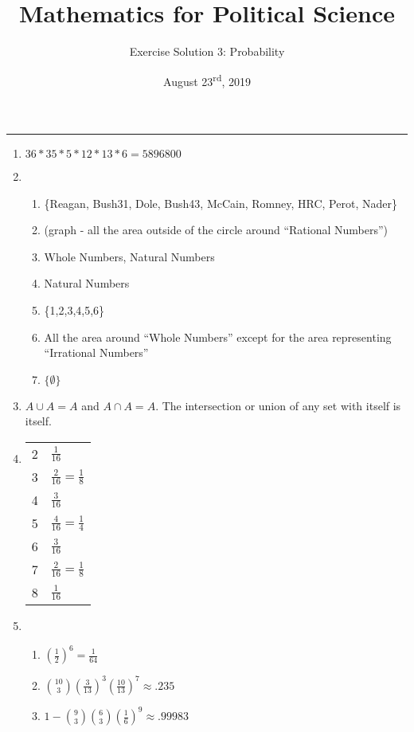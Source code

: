 \documentclass[11pt]{article}
\title{\Large{\bf{\vspace{-100pt}Mathematics for Political Science \vspace{-15pt}}}}
\author{\large{Exercise Solution 3: Probability}}
\date{August 23\textsuperscript{rd}, 2019}
\begin{document}
\maketitle

\hrule


\begin{enumerate}

\item 
$36 * 35 * 5 * 12 * 13 * 6 = 5896800$


\item 
\begin{enumerate}
\item \{Reagan, Bush31, Dole, Bush43, McCain, Romney, HRC, Perot, Nader\}
\item (graph - all the area outside of the circle around ``Rational Numbers'')
\item Whole Numbers, Natural Numbers
\item Natural Numbers
\item \{1,2,3,4,5,6\}
\item All the area around ``Whole Numbers'' except for the area representing ``Irrational Numbers''
\item $\{\emptyset\}$
\end{enumerate}


\item 
$A \cup A = A$ and $A \cap A = A$.  The intersection or union of any set with itself is itself.


\item 

\begin{small}
\begin{tabular}{c|l}
  & \\ \hline
\rule{0cm}{.5cm} 2 & $\frac{1}{16}$ \\
\rule{0cm}{.5cm} 3 & $\frac{2}{16} = \frac{1}{8}$ \\
\rule{0cm}{.5cm} 4 & $\frac{3}{16}$ \\
\rule{0cm}{.5cm} 5 & $\frac{4}{16} = \frac{1}{4}$ \\
\rule{0cm}{.5cm} 6 & $\frac{3}{16}$ \\
\rule{0cm}{.5cm} 7 & $\frac{2}{16} = \frac{1}{8}$ \\
\rule{0cm}{.5cm} 8 & $\frac{1}{16}$ \\
\end{tabular}
\end{small}


\item 
\begin{enumerate}
\item $\left(\frac{1}{2}\right)^6 = \frac{1}{64}$
\item $\binom{10}{3} \left(\frac{3}{13}\right)^3 \left(\frac{10}{13}\right)^7 \approx .235 $
\item $1 - \binom{9}{3} \binom{6}{3} \left(\frac{1}{6}\right)^9 \approx .99983 $
\end{enumerate}





\end{enumerate}
\end{document}
